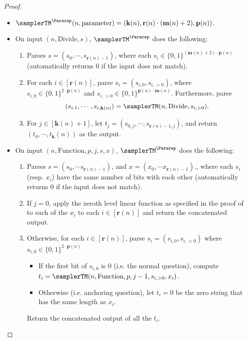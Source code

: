 \begin{proof}
	\begin{itemize}
		\item $\samplerTM^{\Pararep}(n, \text{parameter}) = (\mathbf{k}(n),  \mathbf{r}(n) \cdot (\mathbf{m}(n) +2), \mathbf{p}(n))$. 
		\item On input $(n, \text{Divide}, s)$,  $\samplerTM^{\Pararep}$ does the following: 
		\begin{enumerate} 
			\item Parses $s = (s_0, \cdots, s_{\mathbf{r}(n)-1})$, where each $s_i \in \{0,1\}^{ (\mathbf{m}(n) +2) \cdot \mathbf{p}(n)}$ (automatically returns 0 if the input does not match). 
			\item For each $i \in [\mathbf{r}(n)]$, parse $s_i = (s_{i,0}, s_{i, > 0})$, where $s_{i,0} \in \{0,1\}^{2 \cdot \mathbf{p}(n)}$ and $s_{i, > 0} \in \{0,1\}^{\mathbf{p}(n) \cdot \mathbf{m}(n)}$. Furthermore, parse
			\begin{equation*}
			 	(s_{i,1}, \cdots, s_{i,\mathbf{k}(n)}) = \samplerTM(n, \text{Divide},s_{i, > 0}). 
			\end{equation*}
			\item For $j \in [\mathbf{k}(n) +1]$, let $t_j = (s_{0,j}, \cdots, s_{\mathbf{r}(n)-1,j})$, and return $(t_0, \cdots, t_\mathbf{k}(n))$ as the output.
		\end{enumerate}
		\item On input $(n, \text{Function}, p,j,s,x)$, $\samplerTM^{\Pararep}$ does the following:
		\begin{enumerate} 
			\item Parses $s = (s_0, \cdots s_{\mathbf{r}(n)-1})$, and $x =  (x_0, \cdots x_{\mathbf{r}(n)-1})$., where each $s_i$ (resp. $x_i$) have the same number of bits with each other (automatically returns 0 if the input does not match). 
			\item If $j = 0$, apply the zeroth level linear function as specified in the proof of~ to each of the $x_i$ to each $i \in [\mathbf{r}(n)]$ and return the concatenated output. 
			\item Otherwise, for each $i \in [\mathbf{r}(n)]$, parse $s_i = (s_{i,0}, s_{i, > 0})$ where $s_{i, 0} \in \{0,1\}^{2 \cdot \mathbf{p}(n)}$
			\begin{itemize}
				\item If the first bit of $s_{i, 0}$ is $0$ (i.e. the normal question), compute $t_i = \samplerTM(n, \text{Function}, p,j-1,s_{i, > 0},x_i)$.
				\item Otherwise (i.e. anchoring question), let $t_i = 0$ be the zero string that has the same length as $x_i$. 
			\end{itemize}
			Return the concatenated output of all the $t_i$. 
		\end{enumerate}
	\end{itemize}
	

\end{proof}
